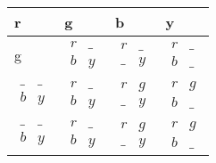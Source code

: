 \documentclass[a4paper]{article}
\begin{document}
\begin{tabular}{|l|l|l|l|}
\hline
r & g & b & y \\ \hline
g & $\begin{matrix}   r & \_ \\   b & y  \end{matrix}$ & $\begin{matrix}   r & \_ \\   \_ & y  \end{matrix}$ & $\begin{matrix}   r & \_ \\   b & \_  \end{matrix}$ \\ \hline
$\begin{matrix}   \_ & \_ \\   b & y  \end{matrix}$ & $\begin{matrix}   r & \_ \\   b & y  \end{matrix}$ & $\begin{matrix}   r & g \\   \_ & y  \end{matrix}$ & $\begin{matrix}   r & g \\   b & \_  \end{matrix}$ \\ \hline
$\begin{matrix}   \_ & \_ \\   b & y  \end{matrix}$ & $\begin{matrix}   r & \_ \\   b & y  \end{matrix}$ & $\begin{matrix}   r & g \\   \_ & y  \end{matrix}$ & $\begin{matrix}   r & g \\   b & \_  \end{matrix}$ \\ \hline
\end{tabular}\\\\
\end{document}
